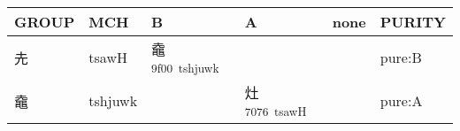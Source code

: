 \documentclass[14pt,a4paper]{scrartcl}
\begin{document}
\begin{longtable}[c]{@{}llllll@{}}
\toprule
\begin{minipage}[b]{0.14\columnwidth}\raggedright\strut
GROUP
\strut\end{minipage} &
\begin{minipage}[b]{0.14\columnwidth}\raggedright\strut
MCH
\strut\end{minipage} &
\begin{minipage}[b]{0.14\columnwidth}\raggedright\strut
B
\strut\end{minipage} &
\begin{minipage}[b]{0.14\columnwidth}\raggedright\strut
A
\strut\end{minipage} &
\begin{minipage}[b]{0.14\columnwidth}\raggedright\strut
none
\strut\end{minipage} &
\begin{minipage}[b]{0.14\columnwidth}\raggedright\strut
PURITY
\strut\end{minipage}\tabularnewline
\midrule
\endhead
\begin{minipage}[t]{0.14\columnwidth}\raggedright\strut
圥
\strut\end{minipage} &
\begin{minipage}[t]{0.14\columnwidth}\raggedright\strut
tsawH
\strut\end{minipage} &
\begin{minipage}[t]{0.14\columnwidth}\raggedright\strut
鼀\textsuperscript{9f00~tshjuwk}
\strut\end{minipage} &
\begin{minipage}[t]{0.14\columnwidth}\raggedright\strut
\strut\end{minipage} &
\begin{minipage}[t]{0.14\columnwidth}\raggedright\strut
\strut\end{minipage} &
\begin{minipage}[t]{0.14\columnwidth}\raggedright\strut
pure:B
\strut\end{minipage}\tabularnewline
\begin{minipage}[t]{0.14\columnwidth}\raggedright\strut
鼀
\strut\end{minipage} &
\begin{minipage}[t]{0.14\columnwidth}\raggedright\strut
tshjuwk
\strut\end{minipage} &
\begin{minipage}[t]{0.14\columnwidth}\raggedright\strut
\strut\end{minipage} &
\begin{minipage}[t]{0.14\columnwidth}\raggedright\strut
灶\textsuperscript{7076~tsawH}
\strut\end{minipage} &
\begin{minipage}[t]{0.14\columnwidth}\raggedright\strut
\strut\end{minipage} &
\begin{minipage}[t]{0.14\columnwidth}\raggedright\strut
pure:A
\strut\end{minipage}\tabularnewline
\bottomrule
\end{longtable}
\end{document}
